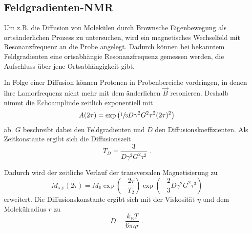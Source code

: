 \subsection{Feldgradienten-NMR}

Um z.B. die Diffusion von Molekülen durch Brownsche Eigenbewegung als ortsänderlichen Prozess zu untersuchen, 
wird ein magnetisches Wechselfeld mit Resonanzfrequenz an die Probe angelegt. Dadurch 
können bei bekanntem Feldgradienten eine ortsabhängie Resonanzfrequenz gemessen werden, die 
Aufschluss über jene Ortsabhängigkeit gibt.

In Folge einer Diffusion können Protonen in Probenbereiche vordringen, in denen ihre Lamorfrequenz nicht mehr
mit dem änderlichen $\vec{B}$ resonieren. Deshalb nimmt die Echoampliude zeitlich exponentiell mit
\begin{equation}
    A(2\tau) = \text{exp}\left(\sfrac{1}{3}D \gamma^2 G^2 \tau^2 (2\tau)^2 \right)
\end{equation}
ab. $G$ beschreibt dabei den Feldgradienten und $D$ den Diffusionskoeffizienten. Als Zeitkonstante
ergibt sich die Diffusionszeit 
\begin{equation}
    T_D = \frac{3}{D \gamma^2 G^2 \tau^2} \; .
\end{equation}

Dadurch wird der zeitliche Verlauf der transversalen Magnetisierung zu 
\begin{equation}
    M_\text{x,y} \left(2\tau\right) = M_0 \exp{\left(-\frac{2\tau}{T_2}\right)} \exp{\left(-\frac{2}{3}D\gamma^2G^2\tau^3\right)} 
    \label{eqn:DK}
\end{equation}
erweitert. Die Diffusionskonstante ergibt sich mit der Viskosität $\eta$ und dem Molekülradius $r$ zu
\begin{equation}
    D = \frac{k_\text{B}T}{6\pi \eta r} \; .
\end{equation}
